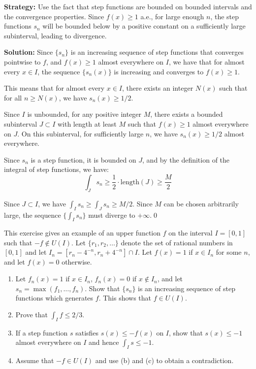\noindent\textbf{Strategy:} Use the fact that step functions are bounded on bounded intervals and the convergence properties. Since $f(x) \geq 1$ a.e., for large enough $n$, the step functions $s_n$ will be bounded below by a positive constant on a sufficiently large subinterval, leading to divergence.

\bigskip\noindent\textbf{Solution:}
Since $\{s_n\}$ is an increasing sequence of step functions that converges pointwise to $f$, and $f(x) \geq 1$ almost everywhere on $I$, we have that for almost every $x \in I$, the sequence $\{s_n(x)\}$ is increasing and converges to $f(x) \geq 1$.

This means that for almost every $x \in I$, there exists an integer $N(x)$ such that for all $n \geq N(x)$, we have $s_n(x) \geq 1/2$.

Since $I$ is unbounded, for any positive integer $M$, there exists a bounded subinterval $J \subset I$ with length at least $M$ such that $f(x) \geq 1$ almost everywhere on $J$. On this subinterval, for sufficiently large $n$, we have $s_n(x) \geq 1/2$ almost everywhere.

Since $s_n$ is a step function, it is bounded on $J$, and by the definition of the integral of step functions, we have:
\[\int_J s_n \geq \frac{1}{2} \cdot \text{length}(J) \geq \frac{M}{2}\]

Since $J \subset I$, we have $\int_I s_n \geq \int_J s_n \geq M/2$. Since $M$ can be chosen arbitrarily large, the sequence $\{\int_I s_n\}$ must diverge to $+\infty$.\qed


\begin{problembox}
This exercise gives an example of an upper function $f$ on the interval $I = [0, 1]$ such that $-f \notin U(I)$. Let $\{r_1, r_2, \ldots\}$ denote the set of rational numbers in $[0, 1]$ and let $I_n = [r_n - 4^{-n}, r_n + 4^{-n}] \cap I$. Let $f(x) = 1$ if $x \in I_n$ for some $n$, and let $f(x) = 0$ otherwise.
\begin{enumerate}[label=(\alph*)]
\item Let $f_n(x) = 1$ if $x \in I_n$, $f_n(x) = 0$ if $x \notin I_n$, and let $s_n = \max(f_1, \ldots, f_n)$. Show that $\{s_n\}$ is an increasing sequence of step functions which generates $f$. This shows that $f \in U(I)$.
\item Prove that $\int_I f \leq 2/3$.
\item If a step function $s$ satisfies $s(x) \leq -f(x)$ on $I$, show that $s(x) \leq -1$ almost everywhere on $I$ and hence $\int_I s \leq -1$.
\item Assume that $-f \in U(I)$ and use (b) and (c) to obtain a contradiction.
\end{enumerate}
\end{problembox}

